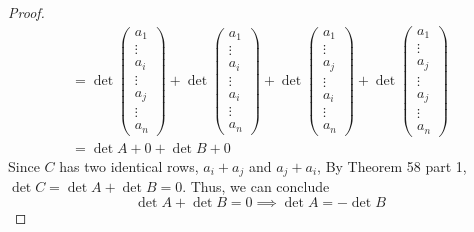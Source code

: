 \documentclass[12pt, a4paper]{article}
\begin{document}
\begin{proof}
\begin{gather*}
        = \det \begin{pmatrix}
            a_1\\ \vdots\\
            a_i\\ \vdots\\
            a_j\\ \vdots\\
            a_n
        \end{pmatrix} +
        \det \begin{pmatrix}
            a_1\\ \vdots\\
            a_i\\ \vdots\\
            a_i\\ \vdots\\
            a_n
        \end{pmatrix} +
        \det \begin{pmatrix}
            a_1\\ \vdots\\
            a_j\\ \vdots\\
            a_i\\ \vdots\\
            a_n
        \end{pmatrix} +
        \det \begin{pmatrix}
            a_1\\ \vdots\\
            a_j\\ \vdots\\
            a_j\\ \vdots\\
            a_n
        \end{pmatrix}\\
        = \det A + 0 + \det B + 0
    \end{gather*}
    Since $C$ has two identical rows, $a_i + a_j$ and $a_j + a_i$,
    By Theorem 58 part 1, $\det C = \det A + \det B = 0$.
    Thus, we can conclude
    \[
        \det A + \det B = 0 \implies \det A = - \det B
    \]
\end{proof}
\end{document}
